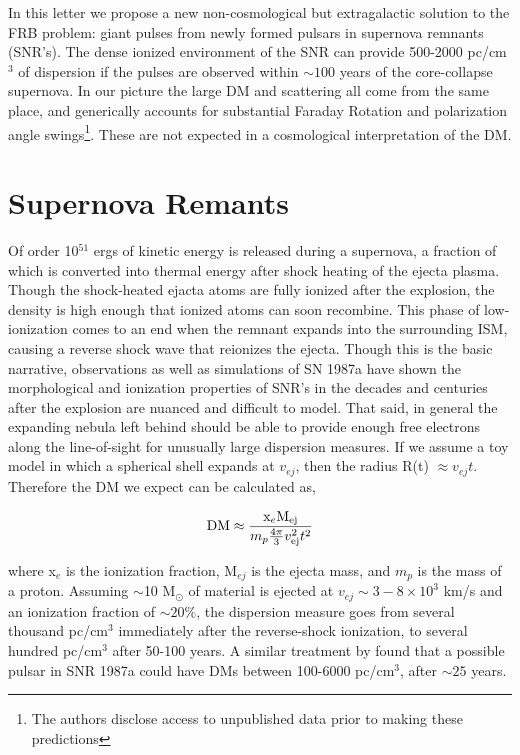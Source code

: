\documentclass[useAMS,usenatbib]{mn2e}
\begin{document}
In this letter we propose a new non-cosmological but extragalactic
solution to the FRB problem: giant pulses from newly formed pulsars in 
supernova remnants (SNR's). The dense ionized environment of the SNR
can provide 500-2000 pc/cm$^3$ of dispersion if the pulses are observed 
within $\sim100$ years of the core-collapse supernova. In our picture the 
large DM and scattering all come from the same place, and generically
accounts for substantial Faraday Rotation and polarization angle
swings\footnote{\label{disclosure}The authors disclose access to 
unpublished data prior to making these predictions}. 
These are not expected in a cosmological interpretation of the DM.



\section{Supernova Remants}
Of order 10$^{51}$ ergs of kinetic energy is released during a supernova, a 
fraction of which is converted into thermal 
energy after shock heating of the 
ejecta plasma. Though the shock-heated ejacta atoms 
are fully ionized after the explosion, the density is high enough that
ionized atoms can soon recombine.
This phase of low-ionization comes to an end when the remnant expands 
into the surrounding ISM, causing a reverse shock wave that reionizes the ejecta.
Though this is the basic narrative, observations \citep{2014ApJ...796...82Z} 
as well as simulations \citep{2014ApJ...794..174P}
of SN 1987a have shown the morphological and ionization properties of SNR's
in the decades and centuries after the explosion are nuanced and 
difficult to model.
That said, in general the expanding nebula left behind 
should be able to provide enough free electrons
along the line-of-sight for unusually large dispersion measures. If we 
assume a toy model in which a spherical shell expands at $v_{ej}$, 
then the radius R(t) $\approx v_{ej} t$. Therefore the DM we expect can be 
calculated as,

\begin{equation}
\textup{DM} \approx  \frac{\textup{x}_e \textup{M}_{\rm ej}}{m_p \frac{4\pi}{3} v_{\rm ej}^2 t^2}
\end{equation}

\noindent where x$_e$ is the ionization fraction, 
M$_{ej}$ is the ejecta mass, and $m_p$ 
is the mass of a proton. Assuming $\sim$10 M$_{\odot}$ of material 
is ejected at $v_{ej}\sim 3-8\times10^3$ km/s and an ionization fraction of 
$\sim 20\% $, the dispersion measure goes from several 
thousand pc/cm$^3$ immediately
after the reverse-shock ionization, to several hundred pc/cm$^3$ after 50-100 years.
A similar treatment by \cite{2014ApJ...796...82Z} found that a possible pulsar in SNR 
1987a could have DMs between 100-6000 pc/cm$^3$, after $\sim 25$ years.
\end{document}
